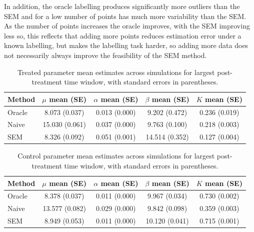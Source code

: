 \documentclass{statsoc}
\newcommand{\1}{\mathbbm{1}}
\begin{document}
In addition, the oracle labelling produces significantly more outliers than the SEM and for a low number of points has much more variability than the SEM. As the number of points increases the oracle improves, with the SEM improving less so, this reflects that adding more points reduces estimation error under a known labelling, but makes the labelling task harder, so adding more data does not necessarily always improve the feasibility of the SEM method.

\begin{table}
\caption{Treated parameter mean estimates across simulations for largest post-treatment time window, with standard errors in parentheses.}
\label{tab:treated_params_summary}
\centering
\begin{minipage}{\textwidth}
\centering
\begin{tabular}{lcccc}
\toprule
Method & $\mu$ mean (SE) & $\alpha$ mean (SE) & $\beta$ mean (SE) & $K$ mean (SE) \\
\midrule
Oracle & 8.073 (0.037) & 0.013 (0.000) & 9.202 (0.472) & 0.236 (0.019) \\
Naive  & 15.030 (0.061) & 0.037 (0.000) & 9.763 (0.100) & 0.218 (0.003) \\
SEM    & 8.326 (0.092) & 0.051 (0.001) & 14.514 (0.352) & 0.127 (0.004) \\
\bottomrule
\end{tabular}
\vspace{0.5em}
\end{minipage}
\end{table}

\begin{table}
\caption{Control parameter mean estimates across simulations for largest post-treatment time window, with standard errors in parentheses.}
\label{tab:control_params_summary}
\centering
\begin{minipage}{\textwidth}
\centering
\begin{tabular}{lcccc}
\toprule
Method & $\mu$ mean (SE) & $\alpha$ mean (SE) & $\beta$ mean (SE) & $K$ mean (SE) \\
\midrule
Oracle & 8.378 (0.037) & 0.011 (0.000) & 9.967 (0.034) & 0.730 (0.002) \\
Naive  & 13.577 (0.082) & 0.029 (0.000) & 9.842 (0.098) & 0.359 (0.003) \\
SEM    & 8.949 (0.053) & 0.011 (0.000) & 10.120 (0.041) & 0.715 (0.001) \\
\bottomrule
\end{tabular}
\vspace{0.5em}
\end{minipage}
\end{table}
\end{document}
